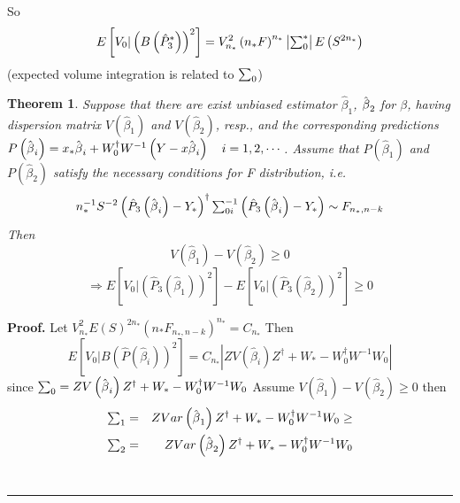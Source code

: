\documentclass{article}
\newtheorem{theorem}{Theorem}
\newenvironment{proof}[1][Proof]{\noindent\textbf{#1.} }{\ \rule{0.5em}{0.5em}}
\begin{document}
So%
\begin{equation*}
E\left[ V_{0}|\left( B\left( \hat{P}_{3}^{\ast }\right) \right) ^{2}\right]
=V_{n_{\ast }}^{2}\left( n_{\ast }F\right) ^{n_{\ast }}\left\vert
\mathop{\textstyle \sum }\nolimits_{0}^{\ast }\right\vert E\left( S^{2n_{\ast }}\right)
\end{equation*}%
(expected volume integration is related to $\mathop{\textstyle \sum }\nolimits_{0}$)

\bigskip

\begin{theorem}
Suppose that there are exist unbiased estimator $\hat{\beta}_{1}$, $\hat{%
\beta}_{2}$ for $\beta $, having dispersion matrix $V\left( \hat{\beta}%
_{1}\right) $ and $V\left( \hat{\beta}_{2}\right) $, resp., and the
corresponding predictions $P\left( \hat{\beta}_{i}\right) =x_{\ast }\hat{%
\beta}_{i}+W_{0}^{\dagger }W^{-1}\left( Y-x\hat{\beta}_{i}\right) \quad
i=1,2,\cdots $.\newline
Assume that $P\left( \hat{\beta}_{1}\right) $ and $P\left( \hat{\beta}%
_{2}\right) $ satisfy the necessary conditions for F distribution, i.e. 
\begin{equation*}
n_{\ast }^{-1}S^{-2}\left( \hat{P}_{3}\left( \hat{\beta}_{i}\right) -Y_{\ast
}\right) ^{\dagger }\tsum\nolimits_{0i}^{-1}\left( \hat{P}_{3}\left( \hat{%
\beta}_{i}\right) -Y_{\ast }\right) \sim F_{n_{\ast },n-k}
\end{equation*}%
Then%
\begin{equation*}
V\left( \hat{\beta}_{1}\right) -V\left( \hat{\beta}_{2}\right) \geq 0
\end{equation*}%
\begin{equation*}
\Rightarrow E\left[ V_{0}|\left( \hat{P}_{3}\left( \hat{\beta}_{1}\right)
\right) ^{2}\right] -E\left[ V_{0}|\left( \hat{P}_{3}\left( \hat{\beta}%
_{2}\right) \right) ^{2}\right] \geq 0
\end{equation*}
\end{theorem}

\bigskip

\begin{proof}
Let $V_{n_{\ast }}^{2}E\left( S\right) ^{2n_{\ast }}\left( n_{\ast
}F_{n_{\ast },n-k}\right) ^{n_{\ast }}=C_{n_{\ast }}$\newline
Then%
\begin{equation*}
E\left[ V_{0}|B\left( \hat{P}\left( \hat{\beta}_{i}\right) \right) ^{2}%
\right] =C_{n_{\ast }}\left\vert ZV\left( \hat{\beta}_{i}\right) Z^{\dagger
}+W_{\ast }-W_{0}^{\dagger }W^{-1}W_{0}\right\vert 
\end{equation*}%
since $\tsum\nolimits_{0}=ZV\left( \hat{\beta}_{i}\right) Z^{\dagger
}+W_{\ast }-W_{0}^{\dagger }W^{-1}W_{0}$\newline
Assume $V\left( \hat{\beta}_{1}\right) -V\left( \hat{\beta}_{2}\right) \geq 0
$\newline
then 
\begin{eqnarray*}
\tsum\nolimits_{1} &=&ZVar\left( \hat{\beta}_{1}\right) Z^{\dagger }+W_{\ast
}-W_{0}^{\dagger }W^{-1}W_{0}\geq  \\
\tsum\nolimits_{2} &=&ZVar\left( \hat{\beta}_{2}\right) Z^{\dagger }+W_{\ast
}-W_{0}^{\dagger }W^{-1}W_{0}
\end{eqnarray*}
\end{proof}
\end{document}
